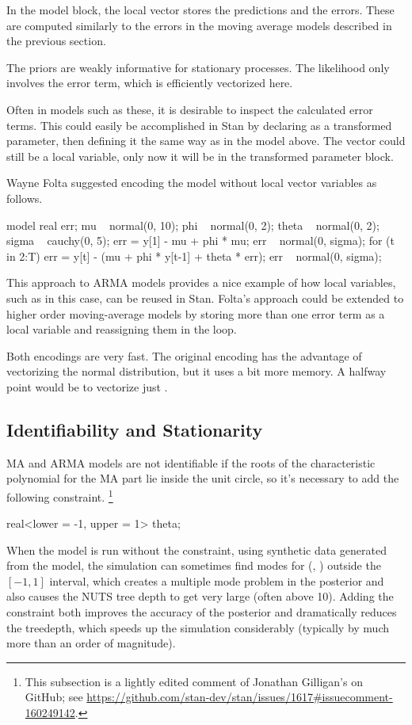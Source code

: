 In the model block, the local vector  stores the predictions
and  the errors.  These are computed similarly to the
errors in the moving average models described in the previous section.  

The priors are weakly informative for stationary processes.  The
likelihood only involves the error term, which is efficiently
vectorized here.

Often in models such as these, it is desirable to inspect the
calculated error terms.  This could easily be accomplished in Stan by
declaring  as a transformed parameter, then defining it the
same way as in the model above.  The vector  could still be a
local variable, only now it will be in the transformed parameter block.

Wayne Folta suggested encoding the model without local vector
variables as follows.
%
\begin{stancode}
model {
  real err;
  mu ~ normal(0, 10);
  phi ~ normal(0, 2);
  theta ~ normal(0, 2);
  sigma ~ cauchy(0, 5);
  err = y[1] - mu + phi * mu;
  err ~ normal(0, sigma);
  for (t in 2:T) {
    err = y[t] - (mu + phi * y[t-1] + theta * err); 
    err ~ normal(0, sigma);
  }
}
\end{stancode}
%
This approach to ARMA models provides a nice example of how local
variables, such as  in this case, can be reused in Stan.
Folta's approach could be extended to higher order moving-average
models by storing more than one error term as a local variable and
reassigning them in the loop.  

Both encodings are very fast.  The original encoding has the advantage
of vectorizing the normal distribution, but it uses a bit more memory.
A halfway point would be to vectorize just .

\subsection{Identifiability and Stationarity}%

MA and ARMA models are not identifiable if the roots of the
characteristic polynomial for the MA part lie inside the unit circle,
so it's necessary to add the following constraint.%
%
\footnote{This subsection is a lightly edited comment of Jonathan
  Gilligan's on GitHub; see
  \url{https://github.com/stan-dev/stan/issues/1617\#issuecomment-160249142}.}
%
\begin{stancode}
real<lower = -1, upper = 1> theta;
\end{stancode}
%
When the model is run without the constraint, using synthetic data
generated from the model, the simulation can sometimes find modes for
(, ) outside the $[-1,1]$ interval, which
creates a multiple mode problem in the posterior and also causes the
NUTS tree depth to get very large (often above 10). Adding the
constraint both improves the accuracy of the posterior and
dramatically reduces the treedepth, which speeds up the simulation
considerably (typically by much more than an order of magnitude).


